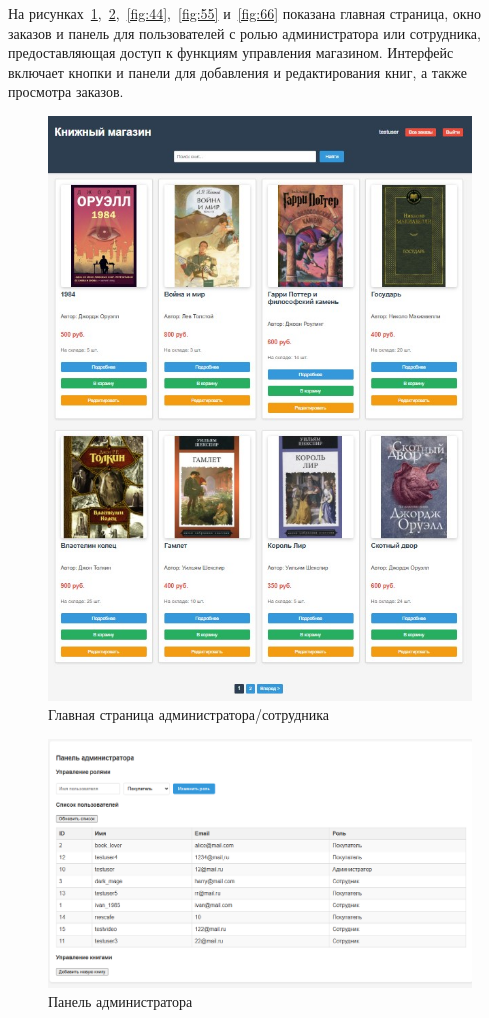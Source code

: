 На рисунках~\ref{fig:22},~\ref{fig:33},~\ref{fig:44},~\ref{fig:55} и~\ref{fig:66} показана главная страница, окно заказов и панель для пользователей с ролью администратора или сотрудника, предоставляющая доступ к функциям управления магазином. Интерфейс включает кнопки и панели для добавления и редактирования книг, а также просмотра заказов.
\begin{figure}[H]
	\centering
	\includegraphics[width=0.9\linewidth]{images/Главная_страница_администратора}
	\caption{Главная страница администратора/сотрудника}
	\label{fig:22}
\end{figure}


\begin{figure}[H]
	\centering
	\includegraphics[width=0.9\linewidth]{images/панельадмина}
	\caption{Панель администратора}
	\label{fig:33}
\end{figure}

